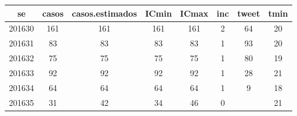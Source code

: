 \begin{tabular}{c|ccccccc}
  \hline
se & casos & casos.estimados & ICmin & ICmax & inc & tweet & tmin \\ 
  \hline
201630 & 161 & 161 & 161 & 161 & 2 & 64 & 20 \\ 
  201631 & 83 & 83 & 83 & 83 & 1 & 93 & 20 \\ 
  201632 & 75 & 75 & 75 & 75 & 1 & 80 & 19 \\ 
  201633 & 92 & 92 & 92 & 92 & 1 & 28 & 21 \\ 
  201634 & 64 & 64 & 64 & 64 & 1 & 9 & 18 \\ 
  201635 & 31 & 42 & 34 & 46 & 0 &  & 21 \\ 
   \hline
\end{tabular}
